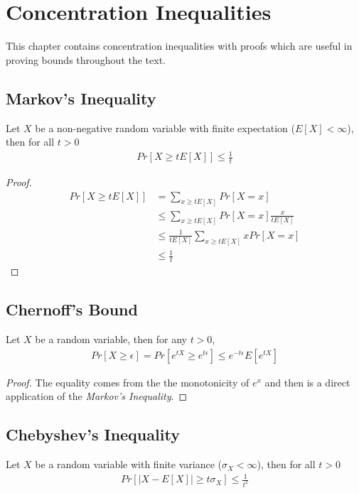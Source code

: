 \documentclass[../toml]{subfiles}
\begin{document}
\chapter{Concentration Inequalities}

This chapter contains concentration inequalities with proofs which are useful in proving
bounds throughout the text.

\section{Markov's Inequality}

\begin{theorem} \label{th:markov_inq}
Let $X$ be a non-negative random variable with finite expectation ($E[X] < \infty$), then
for all $t>0$
\begin{align}
Pr\left[X \geq tE[X]\right] \leq \frac{1}{t}
\end{align}
\begin{proof}
\begin{align}
Pr\left[X \geq tE[X]\right] &= \sum_{x \geq tE[X]} Pr[X = x] \nonumber \\
&\leq \sum_{x \geq tE[X]} Pr[X = x] \frac{x}{tE[X]} \tag{by definition $x \geq tE[X]$} \\
&\leq \frac{1}{tE[X]} \sum_{x \geq tE[X]} xPr[X = x] \nonumber \\
&\leq \frac{1}{t}
\end{align}
\end{proof}
\end{theorem}

\section{Chernoff's Bound}

\begin{theorem} \label{th:chernoff_bound}
Let $X$ be a random variable, then for any $t>0$,
\begin{align}
Pr[X \geq \epsilon] = Pr[e^{tX} \geq e^{t\epsilon}] \leq e^{-t\epsilon} E[e^{tX}]
\end{align}
\end{theorem}

\begin{proof}
The equality comes from the the monotonicity of $e^x$ and then is a direct application
of the \textit{Markov's Inequality}.
\end{proof}

\section{Chebyshev's Inequality}
\begin{theorem} \label{th:chebyshev_inq}
Let $X$ be a random variable with finite variance ($\sigma_X < \infty$), then for all $t>0$
\begin{align}
Pr\left[ |X-E[X]| \geq t\sigma_X \right] \leq \frac{1}{t^2}
\end{align}
\end{theorem}
\end{document}
